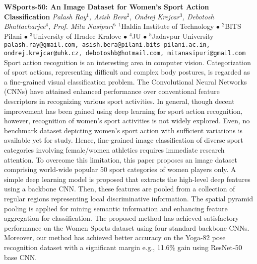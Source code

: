 
    \begin{conf-abstract}[]
        {\textbf{WSports-50: An Image Dataset for Women's Sport Action Classification}}
        {\textit{Palash  Ray$^{1}$, Asish Bera$^{2}$, Ondrej Krejcar$^{3}$, Debotosh Bhattacharjee$^{4}$, Prof. Mita Nasipuri$^{5}$}}
        {$^{1}$Haldia Institute of Technology $\bullet$ $^{2}$BITS Pilani $\bullet$ $^{3}$University of Hradec Kralove $\bullet$ $^{4}$JU $\bullet$ $^{5}$Jadavpur University}
        {\texttt{palash.ray@gmail.com, asish.bera@pilani.bits-pilani.ac.in, ondrej.krejcar@uhk.cz, debotoshb@hotmail.com, mitanasipuri@gmail.com}}
        {Sport action recognition is an interesting area in computer vision. Categorization of sport actions, representing difficult and complex body postures, is regarded as a fine-grained visual classification problem. The Convolutional Neural Networks (CNNs) have attained enhanced performance over conventional feature descriptors in recognizing various sport activities. In general, though decent improvement has been gained using deep learning for sport action recognition, however, recognition of women's sport activities is not widely explored. Even, no benchmark dataset depicting women's sport action with sufficient variations is available yet for study. Hence, fine-grained image classification of diverse sport categories involving female/women athletics requires immediate research attention. To overcome this limitation, this paper proposes an image dataset comprising world-wide popular 50 sport categories of women players only. A simple deep learning model is proposed that extracts the high-level deep features using a backbone CNN. Then, these features are pooled from a collection of regular regions representing local discriminative information. The spatial pyramid pooling is applied for mining semantic information and enhancing feature aggregation for classification. The proposed method has achieved satisfactory performance on the Women Sports dataset using four standard backbone CNNs. Moreover, our method has achieved better accuracy on the Yoga-82 pose recognition dataset with a significant margin e.g., 11.6\% gain using ResNet-50 base CNN.}
    \end{conf-abstract}
        